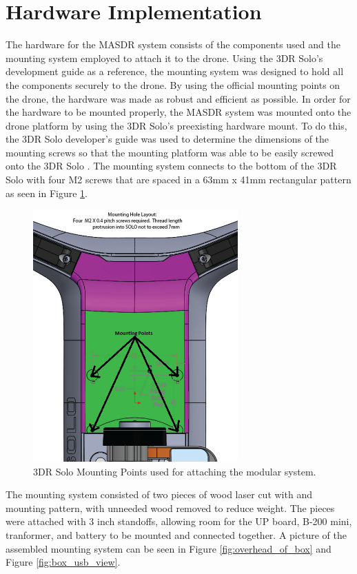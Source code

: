 \section{Hardware Implementation}\label{Mounting}
The hardware for the MASDR system consists of the components used and the mounting system employed to attach it to the drone. Using the 3DR Solo’s development guide as a reference, the mounting system was designed to hold all the components securely to the drone. By using the official mounting points on the drone, the hardware was made as robust and efficient as possible.
In order for the hardware to be mounted properly, the MASDR system was mounted onto the drone platform by using the 3DR Solo’s preexisting hardware mount. To do this, the 3DR Solo developer's guide was used to determine the dimensions of the mounting screws so that the mounting platform was able to be easily screwed onto the 3DR Solo \cite{3dr_devguide}. The mounting system connects to the bottom of the 3DR Solo with four M2 screws that are spaced in a 63mm x 41mm rectangular pattern as seen in Figure \ref{fig:solo_mount}.
\begin{figure}[ht]
\centering
\includegraphics[width=0.70\textwidth]{img/solo_mount_points1.png}
\caption{3DR Solo Mounting Points used for attaching the modular system.}
\label{fig:solo_mount}
\end{figure} \par
The mounting system consisted of two pieces of wood laser cut with and mounting pattern, with unneeded wood removed to reduce weight. The pieces were attached with 3 inch standoffs, allowing room for the UP board, B-200 mini, tranformer, and battery to be mounted and connected together. A picture of the assembled mounting system can be seen in Figure \ref{fig:overhead_of_box} and Figure \ref{fig:box_usb_view}. \par

